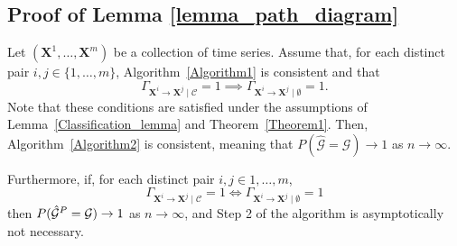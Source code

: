 \documentclass[a4paper,11pt]{article}
\newenvironment{customlem}[1]
  {\renewcommand\theinnercustomlem{#1}\innercustomlem}
  {\endinnercustomlem}
\begin{document}
\subsection{Proof of Lemma \ref{lemma_path_diagram}}
\label{proof_of_lemma_path_diagram}

\begin{customlem}{\ref{lemma_path_diagram}}
Let \((\textbf{X}^1, \dots, \textbf{X}^m)\) be a collection of time series. Assume that, for each distinct pair \(i, j \in \{1, \dots, m\}\), Algorithm~\ref{Algorithm1} is consistent and that 
\begin{equation}\label{ertty}
\Gamma_{\textbf{X}^i\to\textbf{X}^j\mid\mathcal{C}} = 1 \implies  \Gamma_{\textbf{X}^i\to\textbf{X}^j\mid \emptyset} = 1. 
     \end{equation}
Note that these conditions are satisfied under the assumptions of Lemma~\ref{Classification_lemma} and Theorem~\ref{Theorem1}. Then, Algorithm~\ref{Algorithm2} is consistent, meaning that \(P({\hat{\mathcal{G}}} = \mathcal{G}) \to 1\) as \(n \to \infty\).

Furthermore, if, for each distinct pair $i, j\in{1, \dots, m}$, 
\begin{equation}\label{ertty2}\Gamma_{\textbf{X}^i\to\textbf{X}^j\mid\mathcal{C}} = 1 \iff  \Gamma_{\textbf{X}^i\to\textbf{X}^j\mid \emptyset} = 1
\end{equation}
then $P({\hat{\mathcal{G}}^{\rm P}} = \mathcal{G})\to 1$ as $n\to\infty$, and Step 2 of the algorithm is asymptotically not necessary. 

\end{customlem}
\end{document}
